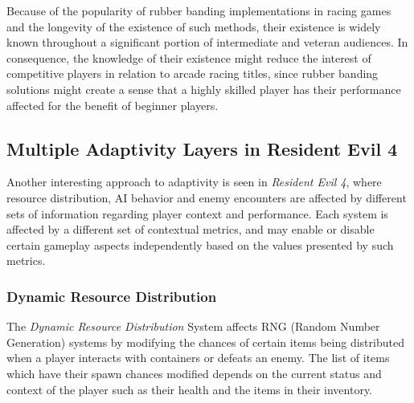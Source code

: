 Because of the popularity of rubber banding implementations in racing games and the longevity of the existence of such methods, their existence is widely known throughout a significant portion of intermediate and veteran audiences. In consequence, the knowledge of their existence might reduce the interest of competitive players in relation to arcade racing titles, since rubber banding solutions might create a sense that a highly skilled player has their performance affected for the benefit of beginner players.

\subsection{Multiple Adaptivity Layers in Resident Evil 4}



Another interesting approach to adaptivity is seen in \emph{Resident Evil 4}, where resource distribution, AI behavior and enemy encounters are affected by different sets of information regarding player context and performance. Each system is affected by a different set of contextual metrics, and may enable or disable certain gameplay aspects independently based on the values presented by such metrics.

\subsubsection{Dynamic Resource Distribution}

The \emph{Dynamic Resource Distribution} System affects RNG (Random Number Generation) systems by modifying the chances of certain items being distributed when a player interacts with containers or defeats an enemy. The list of items which have their spawn chances modified depends on the current status and context of the player such as their health and the items in their inventory.

